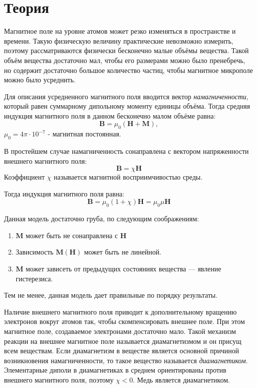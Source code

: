 \section*{Теория}

Магнитное поле на уровне атомов может резко изменяться в пространстве и времени. Такую физическую величину практические невозможно измерить, поэтому рассматриваются физически бесконечно малые объёмы вещества. Такой объём вещества достаточно мал, чтобы его размерами можно было пренебречь, но содержит достаточно большое количество частиц, чтобы магнитное микрополе можно было усреднить.

Для описания усредненного магнитного поля вводится вектор \textit{намагниченности}, который равен суммарному дипольному моменту единицы объёма. Тогда средняя индукция магнитного поля в данном бесконечно малом объёме равна:
$$
\boldsymbol{B} = \mu_0 (\boldsymbol{H} + \boldsymbol{M}),
$$
$\mu_0 = 4 \pi \cdot 10^{-7}$ - магнитная постоянная.

В простейшем случае намагниченность сонаправлена с вектором напряженности внешнего магнитного поля:
$$
\boldsymbol{B} = \chi \boldsymbol{H}
$$
Коэффициент $\chi$ называется магнитной восприимчивостью среды.

Тогда индукция магнитного поля равна:
$$
\boldsymbol{B} =  \mu_0 (1 + \chi) \boldsymbol{H} = \mu_0 \mu \boldsymbol{H}
$$

Данная модель достаточно груба, по следующим соображениям:
\begin{enumerate}
	\item $\boldsymbol{M}$ может быть не сонаправлена с $\boldsymbol{H}$
	
	\item Зависимость $\boldsymbol{M}(\boldsymbol{H})$ может быть не линейной.
	
	\item $\boldsymbol{M}$ может зависеть от предыдущих состояниях вещества --- явление гистерезиса.
\end{enumerate}
Тем не менее, данная модель дает правильные по порядку результаты.

Наличие внешнего магнитного поля приводит к дополнительному вращению электронов вокруг атомов так, чтобы скомпенсировать внешнее поле. При этом магнитное поле, создаваемое электронами достаточно мало. Такой механизм реакции на внешнее магнитное поле называется диамагнетизмом и он присущ всем веществам. Если диамагнетизм в веществе является основной причиной возникновения намагниченности, то такое вещество называется \textit{диамагнетиком}. Элементарные диполи в диамагнетиках в среднем ориентированы против внешнего магнитного поля, поэтому $\chi < 0$. Медь является диамагнетиком.

